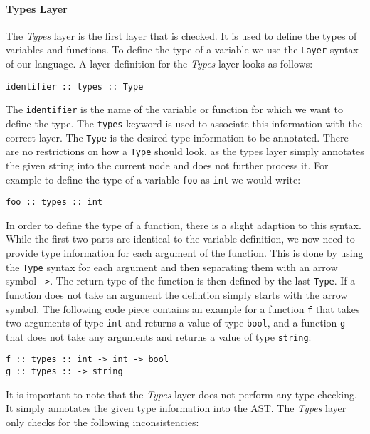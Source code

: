 \paragraph{Types Layer}
The \textit{Types} layer is the first layer that is checked. It is used to define the types of variables and functions. To define the type of a variable we use the \texttt{Layer} syntax of our language. A layer definition for the \textit{Types} layer looks as follows:

\begin{lstlisting}
identifier :: types :: Type
\end{lstlisting}

The \texttt{identifier} is the name of the variable or function for which we want to define the type. The \texttt{types} keyword is used to associate this information with the correct layer. The \texttt{Type} is the desired type information to be annotated. There are no restrictions on how a \texttt{Type} should look, as the types layer simply annotates the given string into the current node and does not further process it. For example to define the type of a variable \texttt{foo} as \texttt{int} we would write:

\begin{lstlisting}
foo :: types :: int
\end{lstlisting}

In order to define the type of a function, there is a slight adaption to this syntax. While the first two parts are identical to the variable definition, we now need to provide type information for each argument of the function. This is done by using the \texttt{Type} syntax for each argument and then separating them with an arrow symbol \texttt{->}. The return type of the function is then defined by the last \texttt{Type}. If a function does not take an argument the defintion simply starts with the arrow symbol. The following code piece contains an example for a function \texttt{f} that takes two arguments of type \texttt{int} and returns a value of type \texttt{bool}, and a function \texttt{g} that does not take any arguments and returns a value of type \texttt{string}:

\begin{lstlisting}
f :: types :: int -> int -> bool
g :: types :: -> string
\end{lstlisting}

It is important to note that the \textit{Types} layer does not perform any type checking. It simply annotates the given type information into the AST. The \textit{Types} layer only checks for the following inconsistencies:

